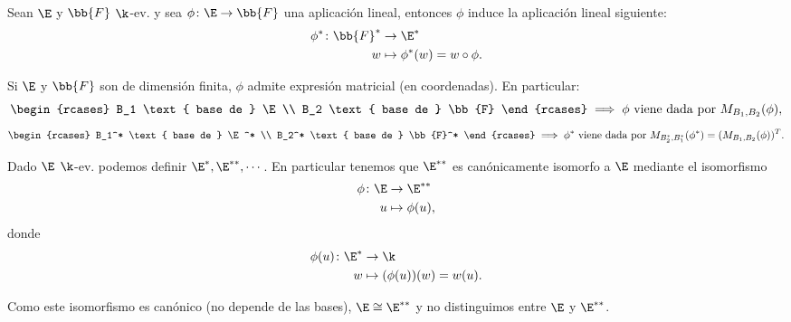 \begin{prop}
    Sean $ \E $ y $ \bb{F} $ $ \k $-ev.  y sea $ \phi \colon \E \to \bb{F}
    $ una aplicación lineal, entonces $ \phi $ induce la aplicación
    lineal siguiente:
    \[
        \begin{aligned}
            \phi^* \colon \bb{F}^* &\to \E^*\\
            w &\mapsto \phi^*(w) = w \circ \phi.
        \end{aligned}
    \]
\end{prop}
\begin{obs}
    Si $ \E $ y $ \bb{F} $ son de dimensión finita, $ \phi $ admite
    expresión matricial (en coordenadas).  En particular:
    \[
        \displaystyle
        \begin{rcases}
            B_1 \text{ base de } \E \\
            B_2 \text{ base de } \bb{F}
        \end{rcases}
        \implies \phi \text{ viene dada por } M_{B_1,B_2}(\phi),
    \]
    \[
        \displaystyle
        \begin{rcases}
            B_1^* \text{ base de } \E^* \\
            B_2^* \text{ base de } \bb{F}^*
        \end{rcases}
        \implies \phi^* \text{ viene dada por } M_{B_2^*,B_1^*}(\phi^*)
        = (M_{B_1,B_2}(\phi))^T.
    \]
\end{obs}
\begin{prop}
    Dado $ \E $ $ \k $-ev.  podemos definir $ \E^*,\E^{**},\cdots $.  En
    particular tenemos que $ \E^{**} $ es canónicamente isomorfo a $ \E
    $ mediante el isomorfismo
    \[
        \begin{aligned}
            \phi \colon \E &\to \E^{**}\\
            u &\mapsto \phi(u),
        \end{aligned}
    \]
    donde
    \[
        \begin{aligned}
            \phi(u) \colon \E^* &\to \k \\
            w &\mapsto (\phi(u))(w) = w(u).
        \end{aligned}
    \]
\end{prop}
\begin{obs}
    Como este isomorfismo es canónico (no depende de las bases), $ \E
    \cong \E^{**} $ y no distinguimos entre $ \E $ y $ \E^{**} $.
\end{obs}

